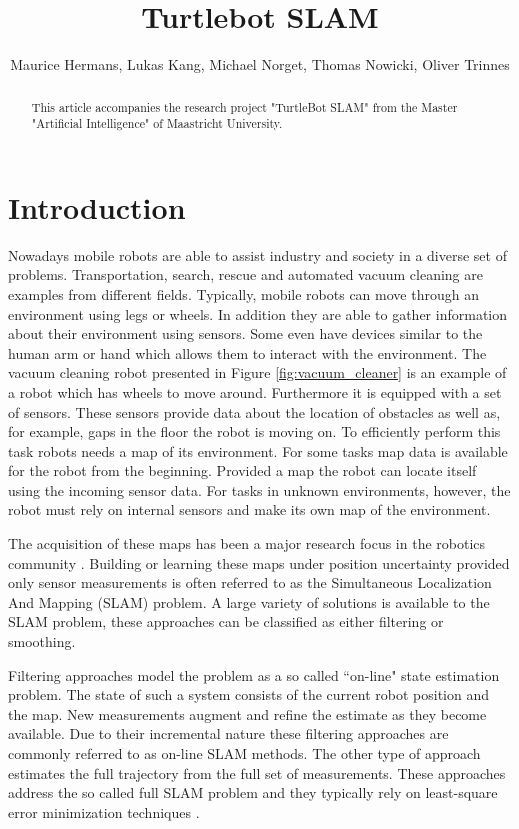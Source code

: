 \documentclass{ba-kecs}
\title{Turtlebot SLAM }
\author{Maurice Hermans, Lukas Kang, Michael Norget, Thomas Nowicki, Oliver Trinnes}
\begin{document}
\maketitle

\begin{abstract}
This article accompanies the research project "TurtleBot SLAM" from the Master "Artificial Intelligence" of Maastricht University.
\end{abstract}

\section{Introduction}
\label{sec:intro}
Nowadays mobile robots are able to assist industry and society in a diverse set of problems. Transportation, search, rescue and automated vacuum cleaning are examples from different fields. Typically, mobile robots can move through an environment using legs or wheels. In addition they are able to gather information about their environment using sensors. Some even have devices similar to the human arm or hand which allows them to interact with the environment. The vacuum cleaning robot presented in Figure \ref{fig:vacuum_cleaner} is an example of a robot which has wheels to move around. Furthermore it is equipped with a set of sensors. These sensors provide data about the location of obstacles as well as, for example, gaps in the floor the robot is moving on. To efficiently perform this task robots needs a map of its environment. For some tasks map data is available for the robot from the beginning. Provided a map the robot can locate itself using the incoming sensor data. For tasks in unknown environments, however, the robot must rely on internal sensors and make its own map of the environment.

The acquisition of these maps has been a major research focus in the robotics community \cite{Thrun,Grisetti,Montemerlo02,Montemerlo}. Building or learning these maps under position uncertainty provided only sensor measurements is often referred to as the Simultaneous Localization And Mapping (SLAM) problem. A large variety of solutions is available to the SLAM problem, these approaches can be classified as either filtering or smoothing.

Filtering approaches model the problem as a so called ``on-line" state estimation problem. The state of such a system consists of the current robot position and the map. New measurements augment and refine the estimate as they become available. Due to their incremental nature these filtering approaches are commonly referred to as on-line SLAM methods. The other type of approach estimates the full trajectory from the full set of measurements. These approaches address the so called full SLAM problem and they typically rely on least-square error minimization techniques \cite{Leastsquares}.
\end{document}
